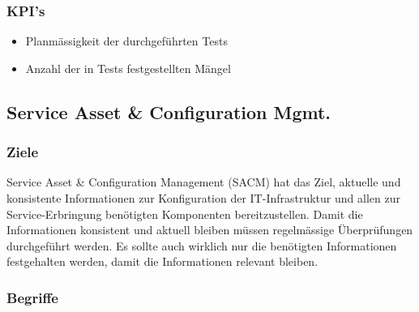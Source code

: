 \subsubsection{KPI's}

\begin{itemize}
	\item Planmässigkeit der durchgeführten Tests
	\item Anzahl der in Tests festgestellten Mängel
\end{itemize}

\subsection{Service Asset \& Configuration Mgmt.}

\subsubsection{Ziele}

Service Asset \& Configuration Management (SACM) hat das Ziel, aktuelle und konsistente Informationen zur Konfiguration der IT-Infrastruktur und allen zur Service-Erbringung benötigten Komponenten bereitzustellen. Damit die Informationen konsistent und aktuell bleiben müssen regelmässige Überprüfungen durchgeführt werden. Es sollte auch wirklich nur die benötigten Informationen festgehalten werden, damit die Informationen relevant bleiben.

\subsubsection{Begriffe}

